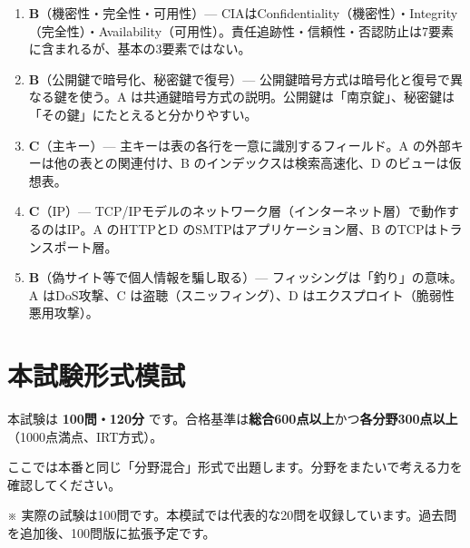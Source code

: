 \begin{enumerate}
  \item \textbf{B}（機密性・完全性・可用性）— CIAはConfidentiality（機密性）・Integrity（完全性）・Availability（可用性）。責任追跡性・信頼性・否認防止は7要素に含まれるが、基本の3要素ではない。
  \item \textbf{B}（公開鍵で暗号化、秘密鍵で復号）— 公開鍵暗号方式は暗号化と復号で異なる鍵を使う。A は共通鍵暗号方式の説明。公開鍵は「南京錠」、秘密鍵は「その鍵」にたとえると分かりやすい。
  \item \textbf{C}（主キー）— 主キーは表の各行を一意に識別するフィールド。A の外部キーは他の表との関連付け、B のインデックスは検索高速化、D のビューは仮想表。
  \item \textbf{C}（IP）— TCP/IPモデルのネットワーク層（インターネット層）で動作するのはIP。A のHTTPとD のSMTPはアプリケーション層、B のTCPはトランスポート層。
  \item \textbf{B}（偽サイト等で個人情報を騙し取る）— フィッシングは「釣り」の意味。A はDoS攻撃、C は盗聴（スニッフィング）、D はエクスプロイト（脆弱性悪用攻撃）。
\end{enumerate}

\section{本試験形式模試}

本試験は \textbf{100問・120分} です。合格基準は\textbf{総合600点以上}かつ\textbf{各分野300点以上}（1000点満点、IRT方式）。

ここでは本番と同じ「分野混合」形式で出題します。分野をまたいで考える力を確認してください。

\vspace{0.5em}
\noindent ※ 実際の試験は100問です。本模試では代表的な20問を収録しています。過去問を追加後、100問版に拡張予定です。

